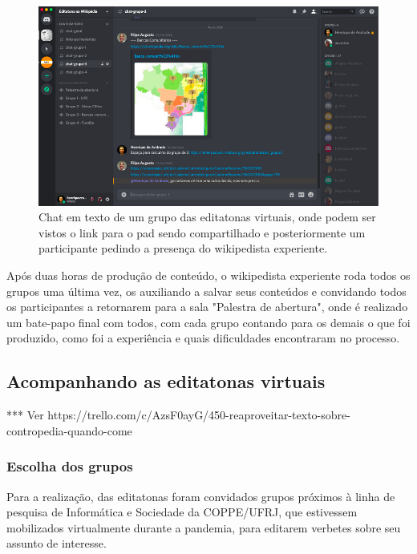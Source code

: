 \begin{figure}[H]
    \centering
    \includegraphics[width=1\textwidth]{Images/discord_full.png}
    \caption{Chat em texto de um grupo das editatonas virtuais, onde podem ser vistos o link para o pad sendo compartilhado e posteriormente um participante pedindo a presença do wikipedista experiente.}
    \label{fig:discord_chat}
\end{figure}

Após duas horas de produção de conteúdo, o wikipedista experiente roda todos os grupos uma última vez, os auxiliando a salvar seus conteúdos e convidando todos os participantes a retornarem para a sala "Palestra de abertura", onde é realizado um bate-papo final com todos, com cada grupo contando para os demais o que foi produzido, como foi a experiência e quais dificuldades encontraram no processo.

\subsection{Acompanhando as editatonas virtuais}

*** Ver https://trello.com/c/AzsF0ayG/450-reaproveitar-texto-sobre-contropedia-quando-come%

\subsubsection{Escolha dos grupos}

Para a realização, das editatonas foram convidados grupos próximos à linha de pesquisa de Informática e Sociedade da COPPE/UFRJ, que estivessem mobilizados virtualmente durante a pandemia, para editarem verbetes sobre seu assunto de interesse.

